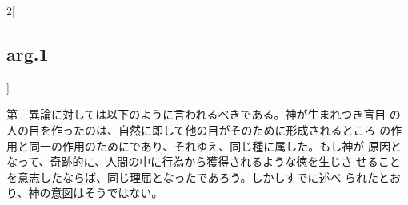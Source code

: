 \documentclass[paper=a4paper,fontsize=10pt,jafontsize=9pt,titlepage]{jlreq}
\begin{document}
\begin{paracol}{2}[\subsection{arg.1}]
\switchcolumn

第三異論に対しては以下のように言われるべきである。神が生まれつき盲目
 の人の目を作ったのは、自然に即して他の目がそのために形成されるところ
 の作用と同一の作用のためにであり、それゆえ、同じ種に属した。もし神が
 原因となって、奇跡的に、人間の中に行為から獲得されるような徳を生じさ
 せることを意志したならば、同じ理屈となったであろう。しかしすでに述べ
 られたとおり、神の意図はそうではない。

\end{paracol}
\end{document}
